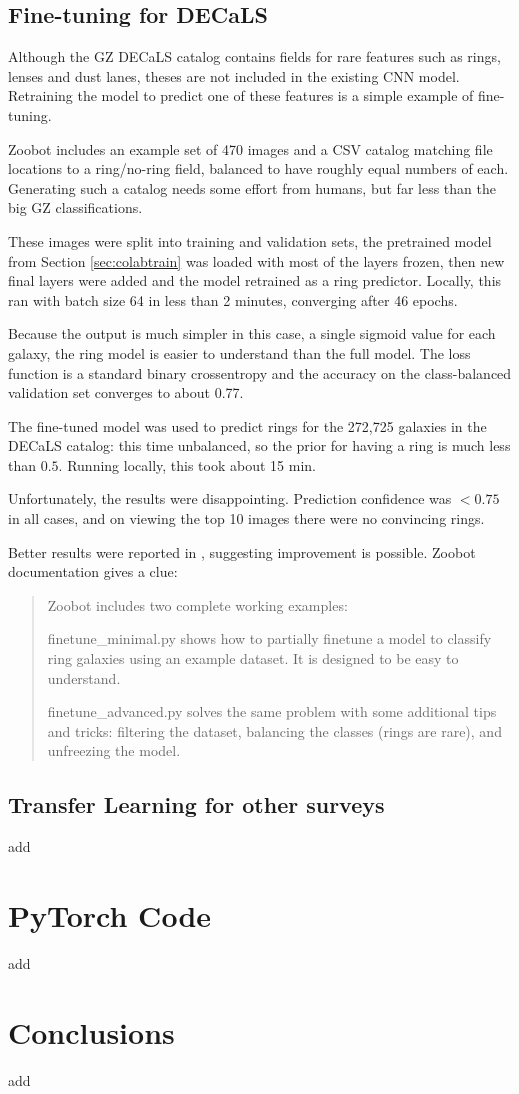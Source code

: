 \documentclass[preprint]{aastex631}
\newcommand{\todo}{\color{red}{TODO}\color{black}\hspace{2mm}}
\begin{document}
\subsection{Fine-tuning for DECaLS}

Although the GZ DECaLS catalog contains fields for rare features such as rings, lenses and dust lanes, theses are not included in the existing CNN model. Retraining the model to predict one of these features is a simple example of fine-tuning.

Zoobot includes an example set of 470 images and a CSV catalog matching file locations to a ring/no-ring field, balanced to have roughly equal numbers of each. Generating such a catalog needs some effort from humans, but far less than the big GZ classifications. 

These images were split into training and validation sets, the pretrained model from Section \ref{sec:colabtrain} was loaded with most of the layers frozen, then new final layers were added and the model retrained as a ring predictor. Locally, this ran with batch size 64 in less than 2 minutes, converging after 46 epochs.

Because the output is much simpler in this case, a single sigmoid value for each galaxy, the ring model is easier to understand than the full model. The loss function is a standard binary crossentropy and the accuracy on the class-balanced validation set converges to about 0.77.

The fine-tuned model was used to predict rings for the 272,725 galaxies in the DECaLS catalog: this time unbalanced, so the prior for having a ring is much less than $0.5$. Running locally, this took about 15 min.

Unfortunately, the results were disappointing. Prediction confidence was $<0.75$ in all cases, and on viewing the top 10 images there were no convincing rings.

Better results were reported in \citet{walmsley_galaxy_2022}, suggesting improvement is possible. Zoobot documentation gives a clue:

\begin{quote}
	 Zoobot includes two complete working examples:

finetune\_minimal.py shows how to partially finetune a model to classify ring galaxies using an example dataset. It is designed to be easy to understand.

finetune\_advanced.py solves the same problem with some additional tips and tricks: filtering the dataset, balancing the classes (rings are rare), and unfreezing the model.
\end{quote}

\subsection{Transfer Learning for other surveys}

\todo add 


\section{PyTorch Code}


\todo add 

\section{Conclusions}

\todo add


{}

\end{document}
